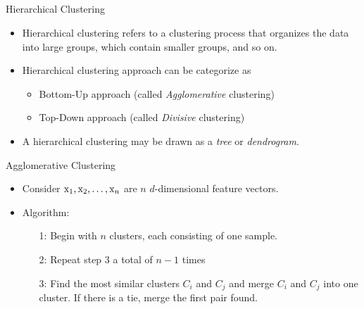 \subsection{}
\begin{frame}{Hierarchical Clustering}
\begin{itemize}
\item Hierarchical clustering refers to a clustering process that organizes the data into large groups, which contain smaller groups, and so on.
\item Hierarchical clustering approach can be categorize as
\begin{itemize}
\item Bottom-Up approach (called \textit{\color{mycolor2}Agglomerative} clustering)
\item Top-Down approach (called \textit{\color{mycolor2}Divisive} clustering)
\end{itemize}
\item A hierarchical clustering may be drawn as a \textit{\color{mycolor2}tree} or \textit{\color{mycolor2}dendrogram}.
\end{itemize}
\end{frame}

\begin{frame}{Agglomerative Clustering}
\begin{itemize}
\setlength{\itemsep}{12pt}
\item Consider ${\rm x}_1,{\rm x}_2,\ldots,{\rm x}_n$ are $n$ $d$-dimensional feature vectors.
\item Algorithm:
\begin{itemize}
\item[1:] Begin with $n$ clusters, each consisting of one sample.
\item[2:] Repeat step 3 a total of $n-1$ times
\item[3:] Find the most similar clusters $C_i$ and $C_j$ and merge $C_i$ and $C_j$ into one cluster. If there is a tie, merge the first pair found.
\end{itemize}
\end{itemize}
\end{frame}

